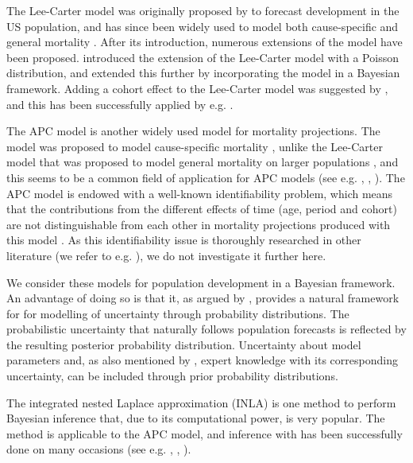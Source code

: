 \newpar The Lee-Carter model was originally proposed by \textcite{LeeCarter1992} to forecast development in the US population, and has since been widely used to model both cause-specific and general mortality \parencite{GirosiKing2007}. After its introduction, numerous extensions of the model have been proposed. \textcite{BROUHNS2002373} introduced the extension of the Lee-Carter model with a Poisson distribution, and \textcite{CZADO2005260} extended this further by incorporating the model in a Bayesian framework. Adding a cohort effect to the Lee-Carter model was suggested by \textcite{RENSHAW2006556}, and this has been successfully applied by e.g. \textcite{Wisniowski2015}.

\newpar The APC model \parencite{Clayton1987} is another widely used model for mortality projections. The model was proposed to model cause-specific mortality \parencite{Clayton1987}, unlike the Lee-Carter model that was proposed to model general mortality on larger populations \parencite{LeeCarter1992}, and this seems to be a common field of application for APC models (see e.g. \textcite{rieblerHeld2010}, \textcite{RieblerHeldRue2012}, \textcite{rieblerSwissSuicide2012}). The APC model is endowed with a well-known identifiability problem, which means that the contributions from the different effects of time (age, period and cohort) are not distinguishable from each other in mortality projections produced with this model \parencite{RieblerThesis2010, RieblerHeldRue2012}. As this identifiability issue is thoroughly researched in other literature (we refer to e.g. \textcite{RieblerThesis2010}), we do not investigate it further here. 

\newpar We consider these models for population development in a Bayesian framework. An advantage of doing so is that it, as argued by \textcite{Wisniowski2015}, provides a natural framework for for modelling of uncertainty through probability distributions. The probabilistic uncertainty that naturally follows population forecasts is reflected by the resulting posterior probability distribution. Uncertainty about model parameters and, as also mentioned by \textcite{Wisniowski2015}, expert knowledge with its corresponding uncertainty, can be included through prior probability distributions.

The integrated nested Laplace approximation (INLA) \parencite{rue2009inla} is one method to perform Bayesian inference that, due to its computational power, is very popular. The \inla method is applicable to the APC model, and inference with \inla has been successfully done on many occasions (see e.g. \textcite{RieblerThesis2010}, \textcite{RieblerHeldRue2012}, \textcite{rieblerSwissSuicide2012}). 

